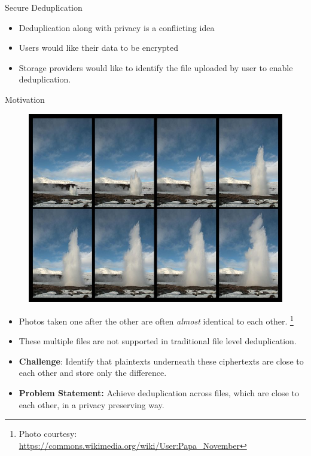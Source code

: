 \documentclass{beamer}
\newcommand\blfootnote[1]{%
  \begingroup
  \renewcommand\thefootnote{}\footnote{#1}%
  \addtocounter{footnote}{-1}%
  \endgroup
}
\begin{document}
\begin{frame}{Secure Deduplication}
\begin{itemize}
	\setlength\itemsep{1em}
	\item Deduplication along with privacy is a conflicting idea

	\item Users would like their data to be encrypted
	
	\item Storage providers would like to identify the file uploaded by user
		to enable deduplication.
\end{itemize}
\end{frame}

\begin{frame}[allowframebreaks]{Motivation}
\begin{figure}
    \includegraphics[scale=0.25]{burst.jpg}
\end{figure}
\begin{itemize}
	\setlength\itemsep{1em}
	\item Photos taken one after the other are often \textit{almost} identical to each other.\blfootnote{Photo courtesy: \url{https://commons.wikimedia.org/wiki/User:Papa_November}}
	\item These multiple files are not supported in traditional file level deduplication.
	\item \textbf{Challenge}: Identify that plaintexts underneath these ciphertexts are 
		close to each other and store only the difference.
    \item \textbf{Problem Statement: }Achieve deduplication across files, which are close to each other, in a privacy preserving way.
\end{itemize}
\end{frame}
\end{document}
